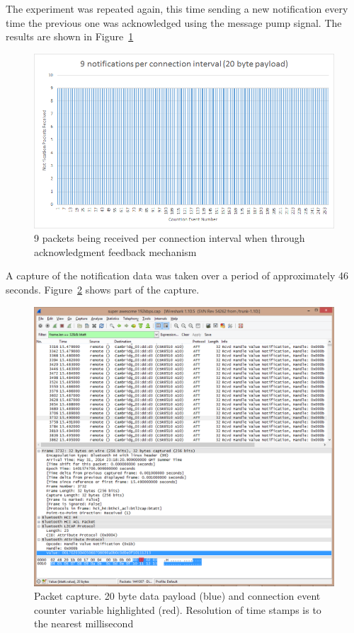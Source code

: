 \documentclass[]{article}
\begin{document}
The experiment was repeated again, this time sending a new notification every time the previous one was acknowledged using the message pump signal. The results are shown in Figure~\ref{fig:9pckt}

\begin{figure}[!h]
	\begin{center}
		\includegraphics[width = \textwidth]{9pckt}
	\end{center}
	\caption{9 packets being received per connection interval when through acknowledgment feedback mechanism}
	\label{fig:9pckt}
\end{figure}
 
A capture of the notification data was taken over a period of approximately 46 seconds. Figure~\ref{fig:wireshark} shows part of the capture. 

\begin{figure}[h]
	\begin{center}
		\includegraphics[width = \textwidth]{wireshark}
	\end{center}
	\caption{Packet capture. 20 byte data payload (blue) and connection event counter variable highlighted (red). Resolution of time stamps is to the nearest millisecond}
	\label{fig:wireshark}
\end{figure}
\end{document}
